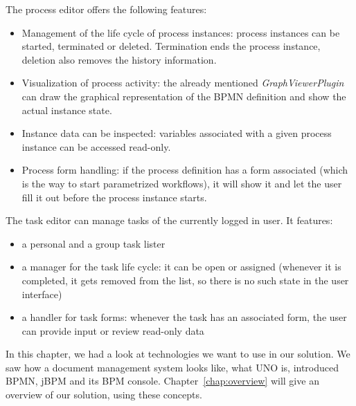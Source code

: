 The process editor offers the following features:

\begin{itemize}
\item Management of the life cycle of process instances: process instances can
be started, terminated or deleted. Termination ends the process instance,
deletion also removes the history information.
\item Visualization of process activity: the already mentioned
\emph{GraphViewerPlugin} can draw the graphical representation of the BPMN
definition and show the actual instance state.
\item Instance data can be inspected: variables associated with a given process
instance can be accessed read-only.
\item Process form handling: if the process definition has a form associated
(which is the way to start parametrized workflows), it will show it and let
the user fill it out before the process instance starts.
\end{itemize}

The task editor can manage tasks of the currently logged in user. It features:

\begin{itemize}
\item a personal and a group task lister
\item a manager for the task life cycle: it can be open or assigned (whenever it is completed, it gets removed from the list, so there is no such state in the user interface)
\item a handler for task forms: whenever the task has an associated form, the user can provide input or review read-only data
\end{itemize}

In this chapter, we had a look at technologies we want to use in our solution.
We saw how a document management system looks like, what UNO is, introduced
BPMN, jBPM and its BPM console. Chapter~\ref{chap:overview} will give an
overview of our solution, using these concepts.
